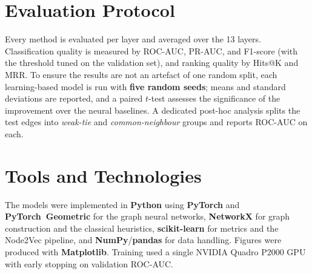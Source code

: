 \section{Evaluation Protocol}
Every method is evaluated per layer and averaged over the 13 layers. Classification quality is
measured by ROC-AUC, PR-AUC, and F1-score (with the threshold tuned on the validation set), and
ranking quality by Hits@K and MRR. To ensure the results are not an artefact of one random split,
each learning-based model is run with \textbf{five random seeds}; means and standard deviations are
reported, and a paired $t$-test assesses the significance of the improvement over the neural
baselines. A dedicated post-hoc analysis splits the test edges into \emph{weak-tie} and
\emph{common-neighbour} groups and reports ROC-AUC on each.

\section{Tools and Technologies}
The models were implemented in \textbf{Python} using \textbf{PyTorch} and \textbf{PyTorch~Geometric}
for the graph neural networks, \textbf{NetworkX} for graph construction and the classical heuristics,
\textbf{scikit-learn} for metrics and the Node2Vec pipeline, and \textbf{NumPy}/\textbf{pandas} for
data handling. Figures were produced with \textbf{Matplotlib}. Training used a single NVIDIA Quadro
P2000 GPU with early stopping on validation ROC-AUC.
